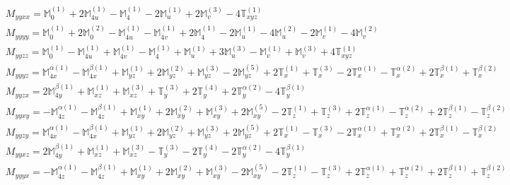 \documentclass[fleqn,8pt,landscape]{jsarticle}
\begin{document}
\begin{align*}
& M_{yyxx} = \mathbb{M}_{0}^{(1)} + 2 \mathbb{M}_{4u}^{(1)} - \mathbb{M}_{4}^{(1)} - 2 \mathbb{M}_{u}^{(1)} + 2 \mathbb{M}_{v}^{(3)} - 4 \mathbb{T}_{xyz}^{(1)} \\
& M_{yyyy} = \mathbb{M}_{0}^{(1)} + 2 \mathbb{M}_{0}^{(2)} - \mathbb{M}_{4u}^{(1)} - \mathbb{M}_{4v}^{(1)} + 2 \mathbb{M}_{4}^{(1)} - 2 \mathbb{M}_{u}^{(1)} - 4 \mathbb{M}_{u}^{(2)} - 2 \mathbb{M}_{v}^{(1)} - 4 \mathbb{M}_{v}^{(2)} \\
& M_{yyzz} = \mathbb{M}_{0}^{(1)} - \mathbb{M}_{4u}^{(1)} + \mathbb{M}_{4v}^{(1)} - \mathbb{M}_{4}^{(1)} + \mathbb{M}_{u}^{(1)} + 3 \mathbb{M}_{u}^{(3)} - \mathbb{M}_{v}^{(1)} + \mathbb{M}_{v}^{(3)} + 4 \mathbb{T}_{xyz}^{(1)} \\
& M_{yyyz} = \mathbb{M}_{4x}^{\alpha(1)} - \mathbb{M}_{4x}^{\beta(1)} + \mathbb{M}_{yz}^{(1)} + 2 \mathbb{M}_{yz}^{(2)} + \mathbb{M}_{yz}^{(3)} - 2 \mathbb{M}_{yz}^{(5)} + 2 \mathbb{T}_{x}^{(1)} + \mathbb{T}_{x}^{(3)} - 2 \mathbb{T}_{x}^{\alpha(1)} - \mathbb{T}_{x}^{\alpha(2)} + 2 \mathbb{T}_{x}^{\beta(1)} + \mathbb{T}_{x}^{\beta(2)} \\
& M_{yyzx} = 2 \mathbb{M}_{4y}^{\beta(1)} + \mathbb{M}_{xz}^{(1)} + \mathbb{M}_{xz}^{(3)} + \mathbb{T}_{y}^{(3)} + 2 \mathbb{T}_{y}^{(4)} + 2 \mathbb{T}_{y}^{\alpha(2)} - 4 \mathbb{T}_{y}^{\beta(1)} \\
& M_{yyxy} = - \mathbb{M}_{4z}^{\alpha(1)} - \mathbb{M}_{4z}^{\beta(1)} + \mathbb{M}_{xy}^{(1)} + 2 \mathbb{M}_{xy}^{(2)} + \mathbb{M}_{xy}^{(3)} + 2 \mathbb{M}_{xy}^{(5)} - 2 \mathbb{T}_{z}^{(1)} + \mathbb{T}_{z}^{(3)} + 2 \mathbb{T}_{z}^{\alpha(1)} - \mathbb{T}_{z}^{\alpha(2)} + 2 \mathbb{T}_{z}^{\beta(1)} - \mathbb{T}_{z}^{\beta(2)} \\
& M_{yyzy} = \mathbb{M}_{4x}^{\alpha(1)} - \mathbb{M}_{4x}^{\beta(1)} + \mathbb{M}_{yz}^{(1)} + 2 \mathbb{M}_{yz}^{(2)} + \mathbb{M}_{yz}^{(3)} + 2 \mathbb{M}_{yz}^{(5)} + 2 \mathbb{T}_{x}^{(1)} - \mathbb{T}_{x}^{(3)} - 2 \mathbb{T}_{x}^{\alpha(1)} + \mathbb{T}_{x}^{\alpha(2)} + 2 \mathbb{T}_{x}^{\beta(1)} - \mathbb{T}_{x}^{\beta(2)} \\
& M_{yyxz} = 2 \mathbb{M}_{4y}^{\beta(1)} + \mathbb{M}_{xz}^{(1)} + \mathbb{M}_{xz}^{(3)} - \mathbb{T}_{y}^{(3)} - 2 \mathbb{T}_{y}^{(4)} - 2 \mathbb{T}_{y}^{\alpha(2)} - 4 \mathbb{T}_{y}^{\beta(1)} \\
& M_{yyyx} = - \mathbb{M}_{4z}^{\alpha(1)} - \mathbb{M}_{4z}^{\beta(1)} + \mathbb{M}_{xy}^{(1)} + 2 \mathbb{M}_{xy}^{(2)} + \mathbb{M}_{xy}^{(3)} - 2 \mathbb{M}_{xy}^{(5)} - 2 \mathbb{T}_{z}^{(1)} - \mathbb{T}_{z}^{(3)} + 2 \mathbb{T}_{z}^{\alpha(1)} + \mathbb{T}_{z}^{\alpha(2)} + 2 \mathbb{T}_{z}^{\beta(1)} + \mathbb{T}_{z}^{\beta(2)} \\

\end{align*}
\end{document}
